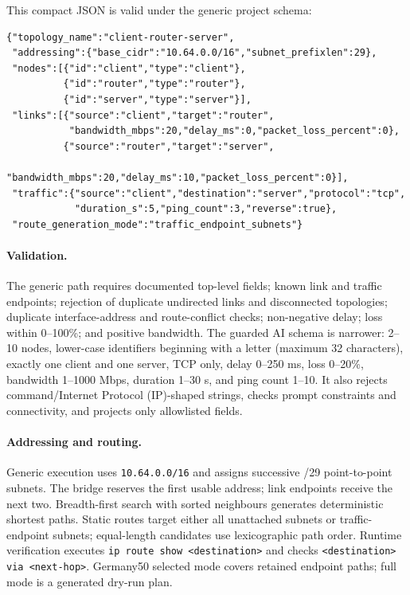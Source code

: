 This compact JSON is valid under the generic project schema:

\begin{verbatim}
{"topology_name":"client-router-server",
 "addressing":{"base_cidr":"10.64.0.0/16","subnet_prefixlen":29},
 "nodes":[{"id":"client","type":"client"},
          {"id":"router","type":"router"},
          {"id":"server","type":"server"}],
 "links":[{"source":"client","target":"router",
           "bandwidth_mbps":20,"delay_ms":0,"packet_loss_percent":0},
          {"source":"router","target":"server",
           "bandwidth_mbps":20,"delay_ms":10,"packet_loss_percent":0}],
 "traffic":{"source":"client","destination":"server","protocol":"tcp",
            "duration_s":5,"ping_count":3,"reverse":true},
 "route_generation_mode":"traffic_endpoint_subnets"}
\end{verbatim}

\paragraph{Validation.} The generic path requires documented top-level fields; known link and traffic endpoints; rejection of duplicate undirected links and disconnected topologies; duplicate interface-address and route-conflict checks; non-negative delay; loss within 0--100\%; and positive bandwidth. The guarded AI schema is narrower: 2--10 nodes, lower-case identifiers beginning with a letter (maximum 32 characters), exactly one client and one server, TCP only, delay 0--250 ms, loss 0--20\%, bandwidth 1--1000 Mbps, duration 1--30 s, and ping count 1--10. It also rejects command/Internet Protocol (IP)-shaped strings, checks prompt constraints and connectivity, and projects only allowlisted fields.

\paragraph{Addressing and routing.} Generic execution uses \texttt{10.64.0.0/16} and assigns successive /29 point-to-point subnets. The bridge reserves the first usable address; link endpoints receive the next two. Breadth-first search with sorted neighbours generates deterministic shortest paths. Static routes target either all unattached subnets or traffic-endpoint subnets; equal-length candidates use lexicographic path order. Runtime verification executes \texttt{ip route show <destination>} and checks \texttt{<destination> via <next-hop>}. Germany50 selected mode covers retained endpoint paths; full mode is a generated dry-run plan.

